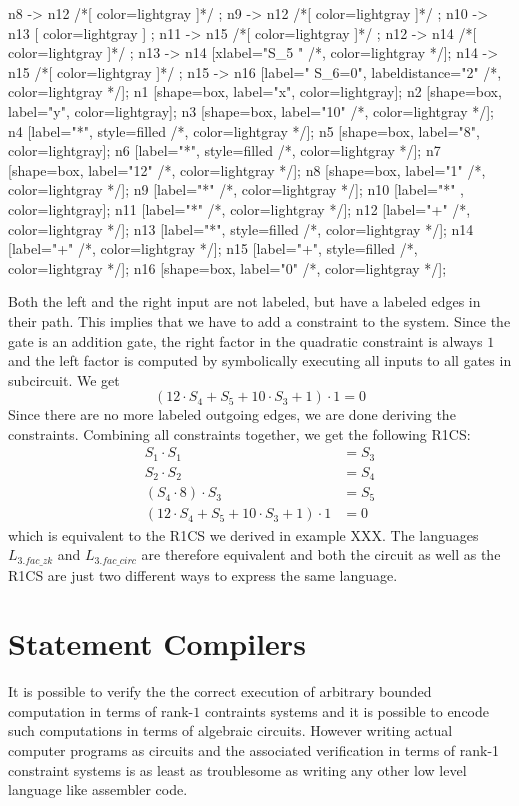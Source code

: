 \begin{example}
\begin{center}
{	n8 -> n12 /*[ color=lightgray ]*/ ;
	n9 -> n12 /*[ color=lightgray ]*/ ;
	n10 -> n13 [ color=lightgray ] ; 
	n11 -> n15 /*[ color=lightgray ]*/ ;
	n12 -> n14 /*[ color=lightgray ]*/ ;	
	n13 -> n14 [xlabel="S_5  "  /*, color=lightgray */];
	n14 -> n15 /*[ color=lightgray ]*/ ;
	n15 -> n16 [label="  S_6=0", labeldistance="2" /*, color=lightgray */];
	n1 [shape=box, label="x", color=lightgray];
	n2 [shape=box, label="y", color=lightgray];
	n3 [shape=box, label="10" /*, color=lightgray */];
	n4 [label="*", style=filled /*, color=lightgray */];
	n5 [shape=box, label="8", color=lightgray];
	n6 [label="*", style=filled /*, color=lightgray */];
	n7 [shape=box, label="12" /*, color=lightgray */];
	n8 [shape=box, label="1" /*, color=lightgray */];
	n9 [label="*" /*, color=lightgray */];
	n10 [label="*" , color=lightgray];
	n11 [label="*" /*, color=lightgray */];	
	n12 [label="+" /*, color=lightgray */];	
	n13 [label="*", style=filled /*, color=lightgray */];
	n14 [label="+" /*, color=lightgray */];
	n15 [label="+", style=filled /*, color=lightgray */];
	n16 [shape=box, label="0" /*, color=lightgray */];		
}
\end{center}
Both the left and the right input are not labeled, but have a labeled edges in their path. This implies that we have to add a constraint to the system. Since the gate is an addition gate, the right factor in the quadratic constraint is always $1$ and the left factor is computed by symbolically executing all inputs to all gates in subcircuit. We get
$$
(12\cdot S_4 + S_5 + 10\cdot S_3 + 1)\cdot 1 = 0
$$
Since there are no more labeled outgoing edges, we are done deriving the constraints. Combining all constraints together, we get the following R1CS:
\begin{align*}
 S_1 \cdot S_1 &= S_3\\
 S_2 \cdot S_2 &= S_4\\
 (S_4\cdot 8)\cdot S_3 &= S_5\\
 (12\cdot S_4 + S_5 + 10\cdot S_3 + 1)\cdot 1 &= 0
\end{align*}
which is equivalent to the R1CS we derived in example XXX. The languages $L_{3.fac\_zk}$ and $L_{3.fac\_circ}$ are therefore equivalent and both the circuit as well as the R1CS are just two different ways to express the same language.
\end{example}
\section{Statement Compilers} It is possible to verify the the correct execution of arbitrary bounded computation in terms of rank-$1$ contraints systems and it is possible to encode such computations in terms of algebraic circuits. However writing actual computer programs as circuits and the associated verification in terms of rank-1 constraint systems is as least as troublesome as writing any other low level language like assembler code. 

